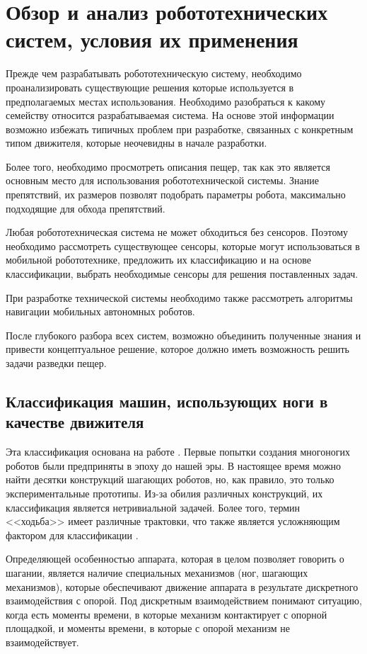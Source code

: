 \chapter{Обзор и анализ робототехнических систем, условия их применения}\label{ch:ch1}
Прежде чем разрабатывать робототехническую систему, необходимо проанализировать существующие решения которые используется в предполагаемых местах использования. Необходимо разобраться к какому семейству относится разрабатываемая система. На основе этой информации возможно избежать типичных проблем при разработке, связанных с конкретным типом движителя, которые неочевидны в начале разработки. 

Более того, необходимо просмотреть описания пещер, так как это является основным место для использования робототехнической системы. Знание препятствий, их размеров позволят подобрать параметры робота, максимально подходящие для обхода препятствий.

Любая робототехническая система не может обходиться без сенсоров. Поэтому необходимо рассмотреть существующее сенсоры, которые могут использоваться в мобильной робототехнике, предложить их классификацию и на основе классификации, выбрать необходимые сенсоры для решения поставленных задач. 

При разработке технической системы необходимо также рассмотреть алгоритмы навигации мобильных автономных роботов. 

После глубокого разбора всех систем, возможно объединить полученные знания и привести концептуальное решение, которое должно иметь возможность решить задачи разведки пещер.

\section{Классификация машин, использующих ноги в качестве движителя}
Эта классификация основана на работе \cite{Maloletov2015dinamica}. Первые попытки создания многоногих роботов были предприняты в эпоху до нашей эры. В настоящее время можно найти десятки конструкций шагающих роботов, но, как правило, это только экспериментальные прототипы. Из-за обилия различных конструкций, их классификация является нетривиальной задачей. Более того, термин <<ходьба>> имеет различные трактовки, что также является усложняющим фактором для классификации \cite{Bel1984,Brisk2009,Ohom1984,Pavl2013}. 

Определяющей особенностью аппарата, которая в целом позволяет говорить о шагании, является наличие специальных механизмов (ног, шагающих механизмов), которые обеспечивают движение аппарата в результате дискретного взаимодействия с опорой. Под дискретным взаимодействием понимают ситуацию, когда есть моменты времени, в которые механизм контактирует с опорной площадкой, и моменты времени, в которые с опорой механизм не взаимодействует.

